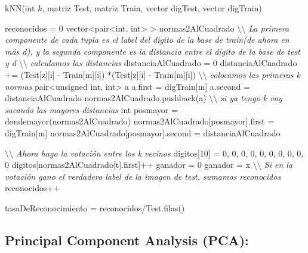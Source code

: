 \begin{algorithm}[H]
\caption{kNN(int $k$, matriz Test, matriz Train, vector digTest, vector digTrain)}
\begin{algorithmic}[1]
\State reconocidos = 0
	\State vector<pair<int, int> > normas2AlCuadrado
	\State \textit{$\setminus\setminus$ La primera componente de cada tupla es el label del digito de la base de train(de ahora en más d), y la segunda componente es la distancia entre el digito de la base de test y d}	
		\State \textit{$\setminus\setminus$ calculamos las distancias}
		\State distanciaAlCuadrado = 0
			\State distanciaAlCuadrado += (Test[z][i] - Train[m][i]) *(Test[z][i] - Train[m][i])
		\EndFor
		 \State \textit{$\setminus\setminus$ colocamos las primeras k normas}
			\State pair<unsigned int, int> a
            \State a.first =  digTrain[m]
            \State a.second = distanciaAlCuadrado
            \State normas2AlCuadrado.pushback(a)
         \Else
         			\State \textit{$\setminus\setminus$  si ya tengo k voy sacando las mayores distancias}
         		    \State int posmayor = dondemayor(normas2AlCuadrado)
                    \State normas2AlCuadrado[posmayor].first = digTrain[m]
                    \State normas2AlCuadrado[posmayor].second = distanciaAlCuadrado
             \EndIf
         \EndIf

	\EndFor
	
\EndFor
\State \textit{$\setminus\setminus$  Ahora hago la votación entre los k vecinos}
\State digitos[10] = { 0, 0, 0, 0, 0, 0, 0, 0, 0, 0 }
	\State digitos[normas2AlCuadrado[t].first]++
\EndFor
\State ganador = 0
				\State  ganador = x
			\EndIf
\EndFor
\State \textit{$\setminus\setminus$  Si en la votación gano el verdadero label de la imagen de test, sumamos reconocidos}
				\State  reconocidos++
\EndIf

\State tasaDeReconocimiento = reconocidos/Test.filas()


\end{algorithmic}
\end{algorithm}

\subsection{Principal Component Analysis (PCA):}


